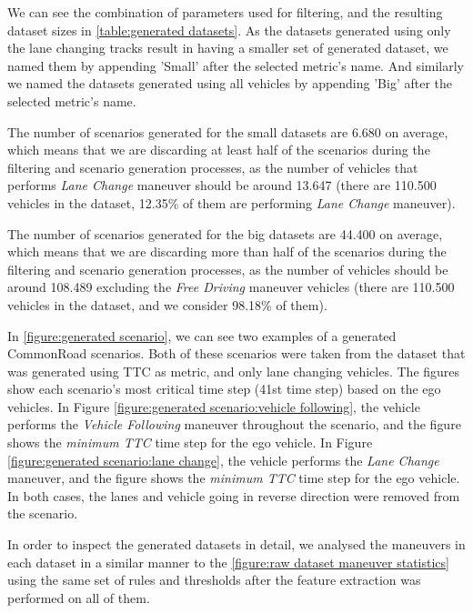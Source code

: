 \documentclass[conference]{IEEEtran}
\begin{document}
We can see the combination of parameters used for filtering, and the resulting dataset sizes in \autoref{table:generated datasets}. As the datasets generated using only the lane changing tracks result in having a smaller set of generated dataset, we named them by appending 'Small' after the selected metric's name. And similarly we named the datasets generated using all vehicles by appending 'Big' after the selected metric's name.

The number of scenarios generated for the small datasets are 6.680 on average, which means that we are discarding at least half of the scenarios during the filtering and scenario generation processes, as the number of vehicles that performs \textit{Lane Change} maneuver should be around 13.647 (there are 110.500 vehicles in the dataset, 12.35\% of them are performing \textit{Lane Change} maneuver).

The number of scenarios generated for the big datasets are 44.400 on average, which means that we are discarding more than half of the scenarios during the filtering and scenario generation processes, as the number of vehicles should be around 108.489 excluding the \textit{Free Driving} maneuver vehicles (there are 110.500 vehicles in the dataset, and we consider 98.18\% of them).

In \autoref{figure:generated scenario}, we can see two examples of a generated CommonRoad scenarios. Both of these scenarios were taken from the dataset that was generated using TTC as metric, and only lane changing vehicles. The figures show each scenario's most critical time step (41st time step) based on the ego vehicles. In Figure \autoref{figure:generated scenario:vehicle following}, the vehicle performs the \textit{Vehicle Following} maneuver throughout the scenario, and the figure shows the \textit{minimum TTC} time step for the ego vehicle. In Figure \autoref{figure:generated scenario:lane change}, the vehicle performs the \textit{Lane Change} maneuver, and the figure shows the \textit{minimum TTC} time step for the ego vehicle. In both cases, the lanes and vehicle going in reverse direction were removed from the scenario.

In order to inspect the generated datasets in detail, we analysed the maneuvers in each dataset in a similar manner to the \autoref{figure:raw dataset maneuver statistics} using the same set of rules and thresholds after the feature extraction was performed on all of them.
\end{document}
